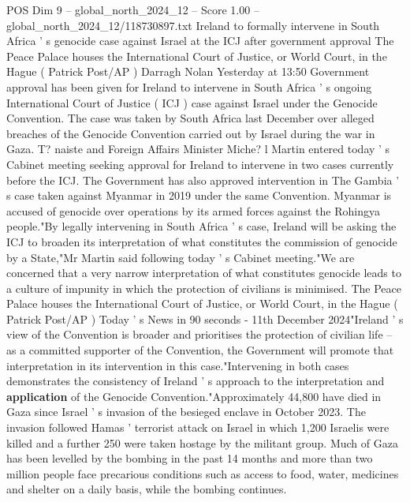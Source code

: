 \begin{textsample}{POS Dim 9 – global\_north\_2024\_12 – Score 1.00 – global\_north\_2024\_12/118730897.txt}  \label{ex:f9_pos_334}
Ireland to formally intervene in South Africa ' s genocide case against Israel at the ICJ after government approval The Peace Palace houses the International Court of Justice, or World Court, in the Hague ( Patrick Post/AP ) Darragh Nolan Yesterday at 13:50 Government approval has been given for Ireland to intervene in South Africa ' s ongoing International Court of Justice ( ICJ ) case against Israel under the Genocide Convention.
The case was taken by South Africa last December over alleged breaches of the Genocide Convention carried out by Israel during the war in Gaza.
T? naiste and Foreign Affairs Minister Miche? l Martin entered today ' s Cabinet meeting seeking approval for Ireland to intervene in two cases currently before the ICJ.
The Government has also approved intervention in The Gambia ' s case taken against Myanmar in 2019 under the same Convention.
Myanmar is accused of genocide over operations by its armed forces against the Rohingya people."By legally intervening in South Africa ' s case, Ireland will be asking the ICJ to broaden its interpretation of what constitutes the commission of genocide by a State,"Mr Martin said following today ' s Cabinet meeting."We are concerned that a very narrow interpretation of what constitutes genocide leads to a culture of impunity in which the protection of civilians is minimised.
The Peace Palace houses the International Court of Justice, or World Court, in the Hague ( Patrick Post/AP ) Today ' s News in 90 seconds - 11th December 2024"Ireland ' s view of the Convention is broader and prioritises the protection of civilian life -- as a committed supporter of the Convention, the Government will promote that interpretation in its intervention in this case."Intervening in both cases demonstrates the consistency of Ireland ' s approach to the interpretation and \textbf{application} of the Genocide Convention."Approximately 44,800 have died in Gaza since Israel ' s invasion of the besieged enclave in October 2023.
The invasion followed Hamas ' terrorist attack on Israel in which 1,200 Israelis were killed and a further 250 were taken hostage by the militant group.
Much of Gaza has been levelled by the bombing in the past 14 months and more than two million people face precarious conditions such as access to food, water, medicines and shelter on a daily basis, while the bombing continues.

\end{textsample}
